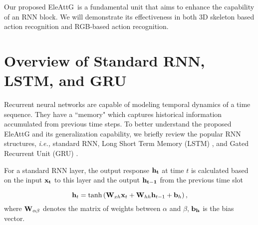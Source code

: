 \documentclass[runningheads]{llncs}
\newcommand{\EleAttG}{{EleAttG~}}
\begin{document}
{	Our proposed \EleAttG is a fundamental unit that aims to enhance the capability of an RNN block. We will demonstrate its effectiveness in both 3D skeleton based action recognition and RGB-based action recognition. 
	
	\section{Overview of Standard RNN, LSTM, and GRU}
	\label{sec:RNN} 
	Recurrent neural networks are capable of modeling temporal dynamics of a time sequence. They have a ``memory" which captures historical information accumulated from previous time steps. To better understand the proposed EleAttG and its generalization capability, we briefly review the popular RNN structures, {\it i.e.,} standard RNN, Long Short Term Memory (LSTM) \cite{hochreiter1997long}, and Gated Recurrent Unit (GRU) \cite{cho2014learning}.
	
	For a standard RNN layer, the output response $\bf{h}_t$ at time $t$ is calculated based on the input $\bf{x}_t$ to this layer and the output $\bf{h}_{t-1}$ from the previous time slot

	\begin{equation}
	\label{equ:rnn}
	{{\bf{h}}_{t}} = \tanh \left( {{\bf{W}}_{xh}}{{\bf{x}}_{t}} + {{\bf{W}}_{hh}}{{\bf{h}}_{t-1} + {\bf{b}}_h} \right),
	\end{equation}
	where ${\bf{W}}_{\alpha\beta}$ denotes the matrix of weights between $\alpha$ and $\beta$, $\bf{b}_h$ is the bias vector.
	
	\begin{comment}
	\begin{equation}
	\label{equ:rn}
	\begin{aligned}
	\mathbf{h}_t  &= \theta \left( {\mathbf{W}}^\mathrm{t}_{xh} \mathbf{x}_t + {\mathbf{W}}^\mathrm{t}_{hh} \mathbf{h}_{t-1} + {b}_h \right). \\
	\end{aligned}
	\end{equation}
	\end{comment}
	
}
\end{document}
